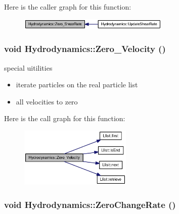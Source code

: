 Here is the caller graph for this function:\nopagebreak
\begin{figure}[H]
\begin{center}
\leavevmode
\includegraphics[width=203pt]{classHydrodynamics_049f88c2f97863edae4489618dc9e853_icgraph}
\end{center}
\end{figure}
\hypertarget{classHydrodynamics_4f65196eb3002238371d0e04dd76c02a}{
\subsubsection[{Zero\_\-Velocity}]{\setlength{\rightskip}{0pt plus 5cm}void Hydrodynamics::Zero\_\-Velocity ()}}
\label{classHydrodynamics_4f65196eb3002238371d0e04dd76c02a}


special uitilities 



\begin{itemize}
\item iterate particles on the real particle list\end{itemize}


\begin{itemize}
\item all velocities to zero \end{itemize}


Here is the call graph for this function:\nopagebreak
\begin{figure}[H]
\begin{center}
\leavevmode
\includegraphics[width=151pt]{classHydrodynamics_4f65196eb3002238371d0e04dd76c02a_cgraph}
\end{center}
\end{figure}
\hypertarget{classHydrodynamics_67e2d72d69156a086d43168f5cd58bf7}{
\subsubsection[{ZeroChangeRate}]{\setlength{\rightskip}{0pt plus 5cm}void Hydrodynamics::ZeroChangeRate ()}}
\label{classHydrodynamics_67e2d72d69156a086d43168f5cd58bf7}


